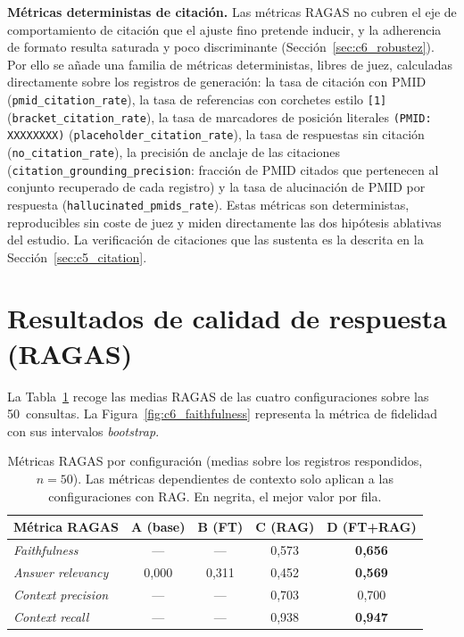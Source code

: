 \documentclass[11pt,a4paper,spanish]{book}
\numberwithin{equation}{chapter}
\numberwithin{figure}{chapter}
\begin{document}
\textbf{Métricas deterministas de citación.} Las métricas RAGAS no cubren el eje de comportamiento de citación que el ajuste fino pretende inducir, y la adherencia de formato resulta saturada y poco discriminante (Sección~\ref{sec:c6_robustez}). Por ello se añade una familia de métricas deterministas, libres de juez, calculadas directamente sobre los registros de generación: la tasa de citación con PMID (\texttt{pmid\_citation\_rate}), la tasa de referencias con corchetes estilo \texttt{[1]} (\texttt{bracket\_citation\_rate}), la tasa de marcadores de posición literales \texttt{(PMID: XXXXXXXX)} (\texttt{placeholder\_citation\_rate}), la tasa de respuestas sin citación (\texttt{no\_citation\_rate}), la precisión de anclaje de las citaciones (\texttt{citation\_\allowbreak grounding\_\allowbreak precision}: fracción de PMID citados que pertenecen al conjunto recuperado de cada registro) y la tasa de alucinación de PMID por respuesta (\texttt{hallucinated\_pmids\_rate}). Estas métricas son deterministas, reproducibles sin coste de juez y miden directamente las dos hipótesis ablativas del estudio. La verificación de citaciones que las sustenta es la descrita en la Sección~\ref{sec:c5_citation}.

\section{Resultados de calidad de respuesta (RAGAS)}
\label{sec:c6_ragas}

La Tabla~\ref{tab:c6_ragas} recoge las medias RAGAS de las cuatro configuraciones sobre las 50~consultas. La Figura~\ref{fig:c6_faithfulness} representa la métrica de fidelidad con sus intervalos \textit{bootstrap}.

\begin{table}[h]
\centering
\begin{tabular}{|l|c|c|c|c|}
\hline
\textbf{Métrica RAGAS} & \textbf{A (base)} & \textbf{B (FT)} & \textbf{C (RAG)} & \textbf{D (FT+RAG)} \\
\hline
\textit{Faithfulness}      & ---       & ---       & 0{,}573         & \textbf{0{,}656} \\
\hline
\textit{Answer relevancy}  & 0{,}000   & 0{,}311   & 0{,}452         & \textbf{0{,}569} \\
\hline
\textit{Context precision} & ---       & ---       & 0{,}703         & 0{,}700 \\
\hline
\textit{Context recall}    & ---       & ---       & 0{,}938         & \textbf{0{,}947} \\
\hline
\end{tabular}
\caption{Métricas RAGAS por configuración (medias sobre los registros respondidos, $n=50$). Las métricas dependientes de contexto solo aplican a las configuraciones con RAG. En negrita, el mejor valor por fila.}
\label{tab:c6_ragas}
\end{table}
\end{document}
